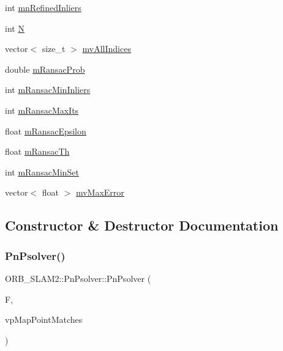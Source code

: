 \begin{DoxyCompactItemize}
int \mbox{\hyperlink{class_o_r_b___s_l_a_m2_1_1_pn_psolver_a4055d308ba46690499985cc082389ea1}{mn\+Refined\+Inliers}}
\item 
int \mbox{\hyperlink{class_o_r_b___s_l_a_m2_1_1_pn_psolver_a130dcfc77d6c98b3f172d1f26d6df37b}{N}}
\item 
vector$<$ size\+\_\+t $>$ \mbox{\hyperlink{class_o_r_b___s_l_a_m2_1_1_pn_psolver_a3470afc96c454059aa0d826b1982570f}{mv\+All\+Indices}}
\item 
double \mbox{\hyperlink{class_o_r_b___s_l_a_m2_1_1_pn_psolver_a9716f832c8f6190e66e0f36d9cac09b8}{m\+Ransac\+Prob}}
\item 
int \mbox{\hyperlink{class_o_r_b___s_l_a_m2_1_1_pn_psolver_a5694fcb7d9f017ebc25cf096c2459923}{m\+Ransac\+Min\+Inliers}}
\item 
int \mbox{\hyperlink{class_o_r_b___s_l_a_m2_1_1_pn_psolver_a6c7c904ed5e57d7672a0884dae5f3252}{m\+Ransac\+Max\+Its}}
\item 
float \mbox{\hyperlink{class_o_r_b___s_l_a_m2_1_1_pn_psolver_aa364e0f3b317e9d0a27c956096c52a03}{m\+Ransac\+Epsilon}}
\item 
float \mbox{\hyperlink{class_o_r_b___s_l_a_m2_1_1_pn_psolver_ae9af481b97b3bfd60f60371af7a534ff}{m\+Ransac\+Th}}
\item 
int \mbox{\hyperlink{class_o_r_b___s_l_a_m2_1_1_pn_psolver_a02709ce4b9dbd8b7537a13365af2a3db}{m\+Ransac\+Min\+Set}}
\item 
vector$<$ float $>$ \mbox{\hyperlink{class_o_r_b___s_l_a_m2_1_1_pn_psolver_a4e20aadb635e38bbc034c8a3ad1917b5}{mv\+Max\+Error}}
\end{DoxyCompactItemize}


\subsection{Constructor \& Destructor Documentation}
\mbox{\label{class_o_r_b___s_l_a_m2_1_1_pn_psolver_a7b4cad992a43620e027bfb4bc9ef24f8}} 
\subsubsection{\texorpdfstring{Pn\+Psolver()}{PnPsolver()}}
{\footnotesize\ttfamily O\+R\+B\+\_\+\+S\+L\+A\+M2\+::\+Pn\+Psolver\+::\+Pn\+Psolver (\begin{DoxyParamCaption}\item[{const \mbox{\hyperlink{class_o_r_b___s_l_a_m2_1_1_frame}{Frame}} \&}]{F,  }\item[{const vector$<$ \mbox{\hyperlink{class_o_r_b___s_l_a_m2_1_1_map_point}{Map\+Point}} $\ast$$>$ \&}]{vp\+Map\+Point\+Matches }\end{DoxyParamCaption})}

